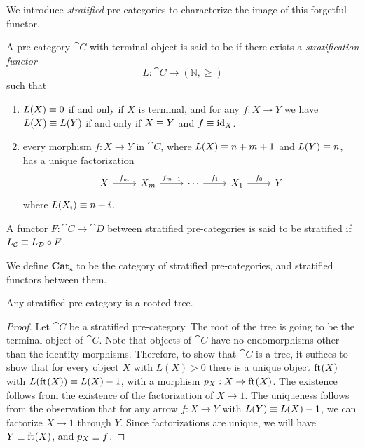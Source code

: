 We introduce \emph{stratified} pre-categories to characterize the image of this forgetful functor.

\begin{defn}
A pre-category $\cat{C}$ with terminal object is said to be  if there exists a 
\emph{stratification functor}
\begin{equation*}
L : \cat{C}\to (\mathbb{N},\geq)
\end{equation*}
such that
\begin{enumerate}
\item $L(X)\equiv 0$ if and only if $X$ is terminal, and for any $f:X\to Y$ we have
$L(X)\equiv L(Y)$ if and only if $X\equiv Y$ and $f\equiv{\mathrm{id}_{X}}$. 
\item every morphism $f:X\to Y$ in $\cat{C}$, where $L(X)\equiv
n+m+1$ and $L(Y)\equiv n$, has a unique factorization 
\begin{equation*}
\begin{tikzcd}
X \arrow[r,"f_m"] & X_m \arrow[r,"f_{m-1}"] & \cdots \arrow[r,"f_1"] & X_1 \arrow[r,"f_0"] & Y
\end{tikzcd}
\end{equation*}
where $L(X_i)\equiv n+i$.
\end{enumerate}
A functor $F:\cat{C}\to\cat{D}$ between stratified pre-categories is said to be stratified 
if $L_{\mathcal{C}}\equiv L_{\mathcal{D}}\circ F$.

We define $\mathbf{Cat_s}$ to be the category of stratified pre-categories, and stratified functors between them.
\end{defn}


\begin{lem}
Any stratified pre-category is a rooted tree.
\end{lem}

\begin{proof}
Let $\cat{C}$ be a stratified pre-category. The root of the tree is going to be the terminal
object of $\cat{C}$. Note that objects of $\cat{C}$ have no endomorphisms other
than the identity morphisms. Therefore, to show that $\cat{C}$ is a tree,
it suffices to show that for every object $X$ with $L(X)>0$ there is
a unique object $\mathrm{ft}_{}(X)$ with $L(\mathrm{ft}_{}(X))\equiv L(X)-1$, with a morphism $p_X:X\to \mathrm{ft}_{}(X)$.
The existence follows from the existence of the factorization of $X\to 1$. The 
uniqueness follows from the observation that for any arrow
$f:X\to Y$ with $L(Y)\equiv L(X)-1$, we can factorize $X\to 1$ through $Y$. Since
factorizations are unique, we will have $Y\equiv \mathrm{ft}_{}(X)$, and $p_X\equiv f$. 
\end{proof}

